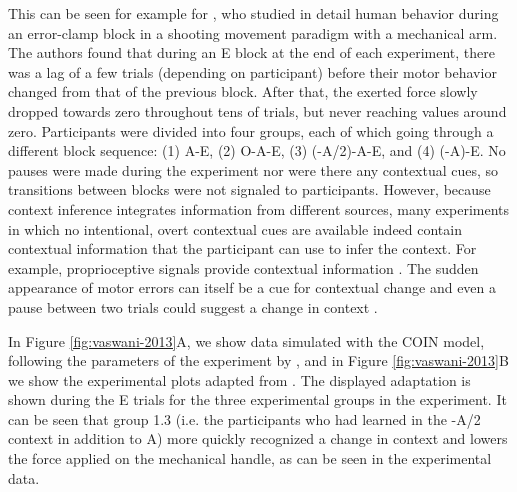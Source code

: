\documentclass[a4paper,doc,floatsintext,natbib]{apa6}
\def \fref #1{Figure \ref{#1}}     %
\begin{document}
This can be seen for example for \cite{Vaswani_Decay_2013}, who studied in detail human behavior during an error-clamp block in a shooting movement paradigm with a mechanical arm. The authors found that during an E block at the end of each experiment, there was a lag of a few trials (depending on participant) before their motor behavior changed from that of the previous block. After that, the exerted force slowly dropped towards zero throughout tens of trials, but never reaching values around zero. Participants were divided into four groups, each of which going through a different block sequence: (1) A-E, (2) O-A-E, (3) (-A/2)-A-E, and (4) (-A)-E. No pauses were made during the experiment nor were there any contextual cues, so transitions between blocks were not signaled to participants. However, because context inference integrates information from different sources, many experiments in which no intentional, overt contextual cues are available indeed contain contextual information that the participant can use to infer the context. For example, proprioceptive signals  provide contextual information \citep{Dizio_Motor_1995,Shadmehr_Adaptive_1994}. The sudden appearance of motor errors can itself be a cue for contextual change \citep{Herzfeld_memory_2014} and even a pause between two trials could suggest a change in context \citep{Ethier_Spontaneous_2008}.

In \fref{fig:vaswani-2013}A, we show data simulated with the COIN model, following the parameters of the experiment by \cite{Vaswani_Decay_2013}, and in \fref{fig:vaswani-2013}B we show the experimental plots adapted from \cite{Vaswani_Decay_2013}. The displayed adaptation is shown during the E trials for the three experimental groups in the experiment. It can be seen that group 1.3 (i.e. the participants who had learned in the -A/2 context in addition to A) more quickly recognized a change in context and lowers the force applied on the mechanical handle, as can be seen in the experimental data.
\end{document}
